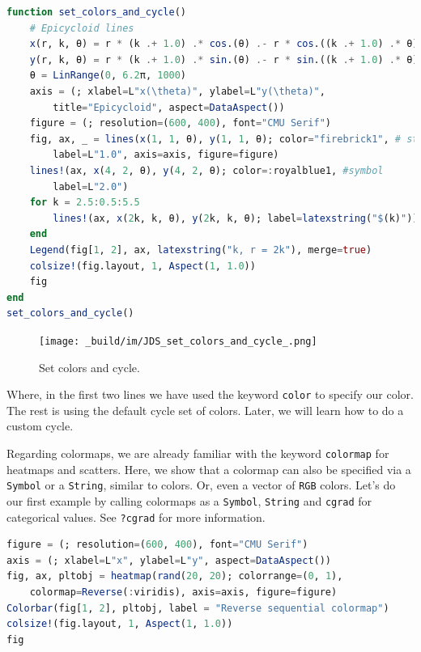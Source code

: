 \documentclass[
  notoc %
]{tufte-book}
\newcommand{\passthrough}[1]{#1}
\begin{document}
\begin{lstlisting}[language=Julia]
function set_colors_and_cycle()
    # Epicycloid lines
    x(r, k, θ) = r * (k .+ 1.0) .* cos.(θ) .- r * cos.((k .+ 1.0) .* θ)
    y(r, k, θ) = r * (k .+ 1.0) .* sin.(θ) .- r * sin.((k .+ 1.0) .* θ)
    θ = LinRange(0, 6.2π, 1000)
    axis = (; xlabel=L"x(\theta)", ylabel=L"y(\theta)",
        title="Epicycloid", aspect=DataAspect())
    figure = (; resolution=(600, 400), font="CMU Serif")
    fig, ax, _ = lines(x(1, 1, θ), y(1, 1, θ); color="firebrick1", # string
        label=L"1.0", axis=axis, figure=figure)
    lines!(ax, x(4, 2, θ), y(4, 2, θ); color=:royalblue1, #symbol
        label=L"2.0")
    for k = 2.5:0.5:5.5
        lines!(ax, x(2k, k, θ), y(2k, k, θ); label=latexstring("$(k)")) #cycle
    end
    Legend(fig[1, 2], ax, latexstring("k, r = 2k"), merge=true)
    colsize!(fig.layout, 1, Aspect(1, 1.0))
    fig
end
set_colors_and_cycle()
\end{lstlisting}

\begin{figure}
\hypertarget{fig:set_colors_and_cycle}{%
\centering
\texttt{[image: \_build/im/JDS\_set\_colors\_and\_cycle\_.png]}
\caption{Set colors and cycle.}\label{fig:set_colors_and_cycle}
}
\end{figure}

Where, in the first two lines we have used the keyword
\passthrough{\lstinline!color!} to specify our color. The rest is using
the default cycle set of colors. Later, we will learn how to do a custom
cycle.

Regarding colormaps, we are already familiar with the keyword
\passthrough{\lstinline!colormap!} for heatmaps and scatters. Here, we
show that a colormap can also be specified via a
\passthrough{\lstinline!Symbol!} or a \passthrough{\lstinline!String!},
similar to colors. Or, even a vector of \passthrough{\lstinline!RGB!}
colors. Let's do our first example by calling colormaps as a
\passthrough{\lstinline!Symbol!}, \passthrough{\lstinline!String!} and
\passthrough{\lstinline!cgrad!} for categorical values. See
\passthrough{\lstinline!?cgrad!} for more information.

\begin{lstlisting}[language=Julia]
figure = (; resolution=(600, 400), font="CMU Serif")
axis = (; xlabel=L"x", ylabel=L"y", aspect=DataAspect())
fig, ax, pltobj = heatmap(rand(20, 20); colorrange=(0, 1),
    colormap=Reverse(:viridis), axis=axis, figure=figure)
Colorbar(fig[1, 2], pltobj, label = "Reverse sequential colormap")
colsize!(fig.layout, 1, Aspect(1, 1.0))
fig
\end{lstlisting}
\end{document}
